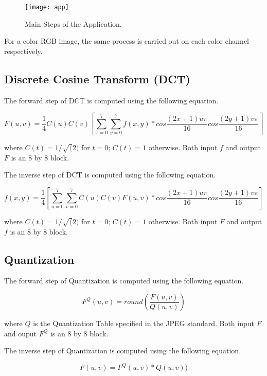 \begin{figure}
\centering
\texttt{[image: app]}
\caption{Main Steps of the Application.}
\label{fig:app}
\end{figure}

For a color RGB image, the same process is carried out on each color channel respectively.

\subsection{Discrete Cosine Transform (DCT)}

The forward step of DCT is computed using the following equation.

\begin{equation}
F(u, v) = \frac{1}{4} C(u) C(v) [\sum_{x=0}^7 \sum_{y=0}^7 f(x,y) * cos\frac{(2x+1)u\pi}{16} cos\frac{(2y+1)v\pi}{16}]
\label{equ:fdct}
\end{equation}

where $C(t) = 1/\sqrt(2)$ for $t = 0$; $C(t) = 1$ otherwise. Both input $f$ and output $F$ is an 8 by 8 block.

The inverse step of DCT is computed using the following equation.

\begin{equation}
f(x, y) = \frac{1}{4} [\sum_{u=0}^7 \sum_{v=0}^7 C(u) C(v) F(u, v) * cos\frac{(2x+1)u\pi}{16} cos\frac{(2y+1)v\pi}{16}]
\label{equ:idct}
\end{equation}

where $C(t) = 1/\sqrt(2)$ for $t = 0$; $C(t) = 1$ otherwise. Both input $F$ and output $f$ is an 8 by 8 block.

\subsection{Quantization}

The forward step of Quantization is computed using the following equation.

\begin{equation}
F^Q(u, v) = round(\frac{F(u, v)}{Q(u, v)})
\label{equ:fq}
\end{equation}

where $Q$ is the Quantization Table specified in the JPEG standard. Both input $F$ and ouput $F^Q$ is an 8 by 8 block.

The inverse step of Quantization is computed using the following equation.

\begin{equation}
F(u, v) = F^Q(u, v) * Q(u, v))
\label{equ:iq}
\end{equation}

